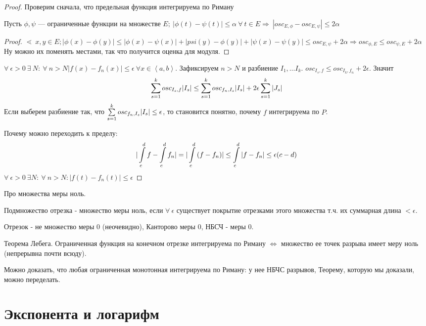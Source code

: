 \documentclass[12pt]{report}
\begin{document}
\begin{proof}
Проверим сначала, что предельная функция интегрируема по Риману
\begin{lm}
Пусть $\phi, \psi$ --- ограниченные функции на множестве $E; ~|\phi(t) - \psi(t)| \le \alpha ~\forall ~t \in E \Rightarrow ~|osc_{E, \phi} - osc_{E, \psi}| \le 2\alpha$ 
\end{lm}
\begin{proof}
$\lessdot ~x, y \in E; |\phi(x) - \phi(y)| \le |\phi(x) - \psi(x)| + |psi(y) - \phi(y)| + |\psi(x) - \psi(y)| \le osc_{E, \psi} + 2\alpha \Rightarrow osc_{\phi, E} \le osc_{\psi, E} + 2\alpha$
Ну можно их поменять местами, так что получится оценка для модуля.
\end{proof}
$\forall ~\epsilon > 0 ~\exists ~N: ~\forall ~n > N |f(x) - f_n(x)| \le \epsilon ~\forall x \in \left<a, b\right>$. Зафиксируем $n > N$ и разбиение $I_1, \dots I_k$. $osc_{I_s, f} \le osc_{I_k, f_n} + 2\epsilon$. Значит
$$\sum\limits_{s = 1}^k{osc_{I_s, f}|I_s|} \le \sum\limits_{s = 1}^k{osc_{f_n, I_s}|I_s|} + 2\epsilon\sum\limits_{s = 1}^k{|J_s|}$$
Если выберем разбиение так, что $\sum\limits_{s = 1}^k{osc_{f_n, I_s}|I_s|} \le \epsilon$, то становится понятно, почему $f$ интегрируема по $P$.

Почему можно переходить к пределу:
$$|\int\limits_c^d{f} - \int\limits_c^d{f_n}| = |\int\limits_c^d{(f - f_n)}| \le \int\limits_c^d{|f - f_n|} \le \epsilon(c - d)$$
$\forall ~\epsilon > 0 ~\exists N: ~\forall ~n > N: |f(t) - f_n(t)| \le \epsilon$
\end{proof}

\begin{note}
Про множества меры ноль.

Подмножество отрезка - множество меры ноль, если $\forall ~\epsilon$ существует покрытие отрезками этого множества т.ч. их суммарная длина $< \epsilon$.

Отрезок - не множество меры $0$ (неочевидно), Канторово меры $0$, НБСЧ - меры $0$.

Теорема Лебега. Ограниченная функция на конечном отрезке  интегрируема по Риману $\Leftrightarrow$ множество ее точек разрыва имеет меру ноль (непрерывна почти всюду).

Можно доказать, что любая ограниченная монотонная интегрируема по Риману: у нее НБЧС разрывов, Теорему, которую мы доказали, можно переделать.
\end{note}

\chapter{Экспонента и логарифм}
\end{document}
